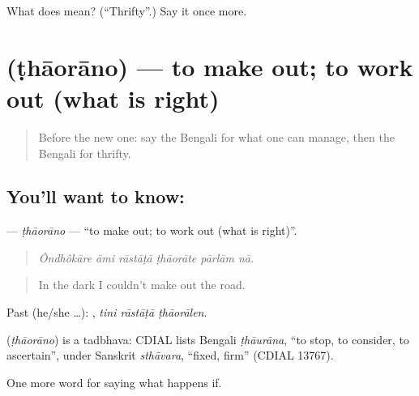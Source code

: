 \begin{tcolorbox}[breakable,colback=teal!4,colframe=teal!35!black,title={Before you move on}]
What does  mean? (\textquotedblleft{}Thrifty\textquotedblright{}.) Say it once more.
\end{tcolorbox}
\section[\texorpdfstring{\bn{ঠাওরানো} (ṭhāorāno)}{ঠাওরানো (ṭhāorāno)}]{ (ṭhāorāno) — to make out; to work out (what is right)}

\label{lesson:BN-C545-thaorano}



\begin{quote}
Before the new one: say the Bengali for what one can manage, then the Bengali for thrifty.
\end{quote}

\subsection*{You'll want to know: }
\textbf{} — \emph{ṭhāorāno} — \textquotedblleft{}to make out; to work out (what is right)\textquotedblright{}.

\begin{quote}
     
\end{quote}

\begin{quote}
\emph{Ôndhôkāre āmi rāstāṭā ṭhāorāte pārlām nā.}
\end{quote}

\begin{quote}
In the dark I couldn't make out the road.
\end{quote}

Past (he/she …):   , \emph{tini rāstāṭā ṭhāorālen}.

\begin{cousinweb}
\textbf{} (\emph{ṭhāorāno}) is a tadbhava: CDIAL lists Bengali \emph{ṭhāurāna}, \textquotedblleft{}to stop, to consider, to ascertain\textquotedblright{}, under Sanskrit \emph{sthāvara}, \textquotedblleft{}fixed, firm\textquotedblright{} (CDIAL 13767).
\end{cousinweb}

\begin{grammarlens}[title={What you've built}]
One more word for saying what happens if.
\end{grammarlens}

